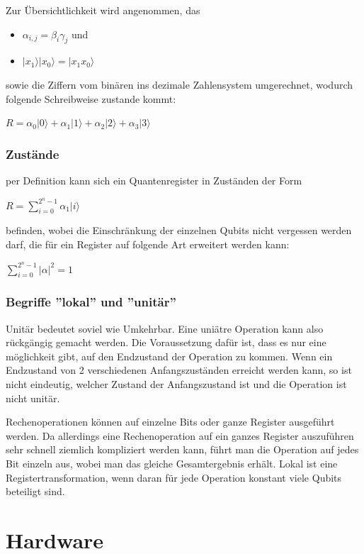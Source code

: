 Zur Übersichtlichkeit wird angenommen, das
\begin{itemize}
	\item $\alpha_{i,j} = \beta_i\gamma_j$ und
	\item $|x_1\rangle|x_0\rangle = |x_1 x_0\rangle$
\end{itemize}
sowie die Ziffern vom binären ins dezimale Zahlensystem umgerechnet, wodurch folgende Schreibweise zustande kommt:

$R = \alpha_0|0\rangle+\alpha_1|1\rangle+\alpha_2|2\rangle+\alpha_3|3\rangle$

\subsubsection{Zustände}
\label{sec:zustande}

per Definition kann sich ein Quantenregister in Zuständen der Form

$R = \displaystyle\sum_{i=0}^{2^n-1} \alpha_1|i\rangle$

befinden, wobei die Einschränkung der einzelnen Qubits nicht vergessen werden darf, die für ein Register auf folgende Art erweitert werden kann:

$\displaystyle\sum_{i=0}^{2^n-1}  |\alpha|^2 = 1$

\subsubsection{Begriffe ''lokal'' und ''unitär''}
\label{sec:lokal_unitar}

Unitär bedeutet soviel wie Umkehrbar. Eine uniätre Operation kann also rückgängig gemacht werden. Die Voraussetzung dafür ist, dass es nur eine möglichkeit gibt, auf den Endzustand der Operation zu kommen. Wenn ein Endzustand von 2 verschiedenen Anfangszuständen erreicht werden kann, so ist nicht eindeutig, welcher Zustand der Anfangszustand ist und die Operation ist nicht unitär.

Rechenoperationen können auf einzelne Bits oder ganze Register ausgeführt werden. Da allerdings eine Rechenoperation auf ein ganzes Register auszuführen sehr schnell ziemlich kompliziert werden kann, führt man die Operation auf jedes Bit einzeln aus, wobei man das gleiche Gesamtergebnis erhält. Lokal ist eine Registertransformation, wenn daran für jede Operation konstant viele Qubits beteiligt sind.

\section{Hardware}
\label{sec:hardware}

